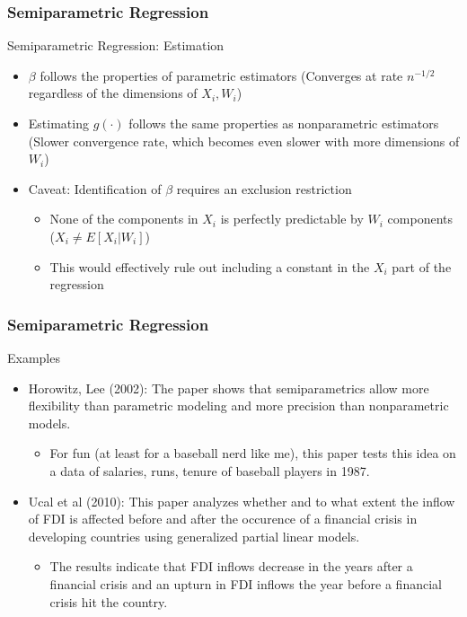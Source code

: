 \documentclass{beamer}
\begin{document}
\begin{frame}
\frametitle{Semiparametric Regression}
Semiparametric Regression: Estimation
\begin{itemize}
\item $\beta$ follows the properties of parametric estimators (Converges at rate $n^{-1/2}$ regardless of the dimensions of $X_i, W_i$)
\item Estimating $g(\cdot)$ follows the same properties as nonparametric estimators  (Slower convergence rate, which becomes even slower with more dimensions of $W_i$)
\item Caveat: Identification of $\beta$ requires an exclusion restriction
\begin{itemize}
\item None of the components in $X_i$ is perfectly predictable by $W_i$ components ($X_i\neq E[X_i|W_i]$)
\item This would effectively rule out including a constant in the $X_i$ part of the regression
\end{itemize}
\end{itemize}
\end{frame}

\begin{frame}
\frametitle{Semiparametric Regression}
Examples
\begin{itemize}
\item Horowitz, Lee (2002): The paper shows that semiparametrics allow more flexibility than parametric modeling and more precision than nonparametric models. 
\begin{itemize}
\item For fun (at least for a baseball nerd like me), this paper tests this idea on a data of salaries, runs, tenure of baseball players in 1987. 
\end{itemize}
\item Ucal et al (2010): This paper analyzes whether and to what extent the inflow of FDI is affected before and after the occurence of a financial crisis in developing countries using generalized partial linear models. 
\begin{itemize}
\item The results indicate that FDI inflows decrease in the years after a financial crisis and an upturn in FDI inflows the year before a financial crisis hit the country.
\end{itemize}
\end{itemize}
\end{frame}
\end{document}
